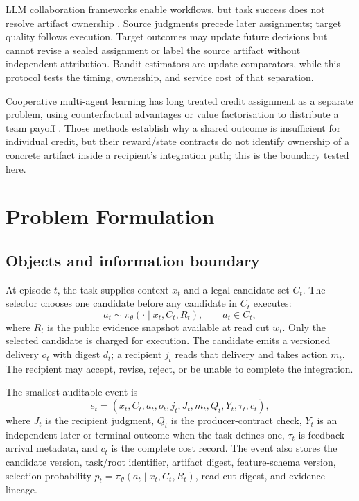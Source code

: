\documentclass[sigconf,anonymous]{aamas}
\begin{document}
LLM collaboration frameworks enable workflows, but task success does not resolve artifact ownership \cite{wu2023autogen,zhuge2024gptswarm}. Source judgments precede later assignments; target quality follows execution. Target outcomes may update future decisions but cannot revise a sealed assignment or label the source artifact without independent attribution. Bandit estimators are update comparators, while this protocol tests the timing, ownership, and service cost of that separation.

Cooperative multi-agent learning has long treated credit assignment as a separate problem, using counterfactual advantages or value factorisation to distribute a team payoff \cite{foerster2018coma,rashid2020qmix}. Those methods establish why a shared outcome is insufficient for individual credit, but their reward/state contracts do not identify ownership of a concrete artifact inside a recipient's integration path; this is the boundary tested here.

\section{Problem Formulation}
\label{sec:problem}

\subsection{Objects and information boundary}
At episode $t$, the task supplies context $x_t$ and a legal candidate set $C_t$. The selector chooses one candidate before any candidate in $C_t$ executes:
\begin{equation}
 a_t\sim\pi_{\theta}(\cdot\mid x_t,C_t,R_t),\qquad a_t\in C_t,
 \label{eq:choice}
\end{equation}
where $R_t$ is the public evidence snapshot available at read cut $w_t$. Only the selected candidate is charged for execution. The candidate emits a versioned delivery $o_t$ with digest $d_t$; a recipient $j_t$ reads that delivery and takes action $m_t$. The recipient may accept, revise, reject, or be unable to complete the integration.

The smallest auditable event is
\begin{equation}
 e_t=(x_t,C_t,a_t,o_t,j_t,J_t,m_t,Q_t,Y_t,\tau_t,c_t),
 \label{eq:event}
\end{equation}
where $J_t$ is the recipient judgment, $Q_t$ is the producer-contract check, $Y_t$ is an independent later or terminal outcome when the task defines one, $\tau_t$ is feedback-arrival metadata, and $c_t$ is the complete cost record. The event also stores the candidate version, task/root identifier, artifact digest, feature-schema version, selection probability $p_t=\pi_\theta(a_t\mid x_t,C_t,R_t)$, read-cut digest, and evidence lineage.
\end{document}
